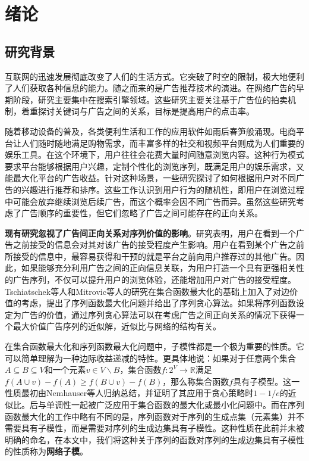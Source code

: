 \chapter{绪论}

\section{研究背景}
互联网的迅速发展彻底改变了人们的生活方式。它突破了时空的限制，极大地便利了人们获取各种信息的能力。随之而来的是广告推荐技术的演进。在网络广告的早期阶段，研究主要集中在搜索引擎领域。这些研究主要关注基于广告位的拍卖机制，着重探讨关键词与广告之间的关系，目标是提高用户的点击率\cite{edelman2007internet,attenberg2009modeling}。

随着移动设备的普及，各类便利生活和工作的应用软件如雨后春笋般涌现。电商平台让人们随时随地满足购物需求，而丰富多样的社交和视频平台则成为人们重要的娱乐工具。在这个环境下，用户往往会花费大量时间随意浏览内容。这种行为模式要求平台能够根据用户兴趣，定制个性化的浏览序列，既满足用户的娱乐需求，又能最大化平台的广告收益。针对这种场景，一些研究\cite{kempe2008cascade,craswell2008experimental,tang2017robust}探讨了如何根据用户对不同广告的兴趣进行推荐和排序。这些工作认识到用户行为的随机性，即用户在浏览过程中可能会放弃继续浏览后续广告，而这个概率会因不同广告而异。虽然这些研究考虑了广告顺序的重要性，但它们忽略了广告之间可能存在的正向关系。

\textbf{现有研究忽视了广告间正向关系对序列价值的影响}。研究表明，用户在看到一个广告之前接受的信息会对其对该广告的接受程度产生影响\cite{loda2005sequence}。用户在看到某个广告之前所接受的信息中，最容易获得和干预的就是平台之前向用户推荐过的其他广告。因此，如果能够充分利用广告之间的正向信息关联，为用户打造一个具有更强相关性的广告序列，不仅可以提升用户的浏览体验，还能增加用户对广告的接受程度。Tschiatschek等人\cite{tschiatschek2017selecting}和Mitrovic等人\cite{mitrovic2018submodularity}的研究在集合函数最大化的基础上加入了对边价值的考虑，提出了序列函数最大化问题并给出了序列贪心算法。如果将序列函数设定为广告的价值，通过序列贪心算法可以在考虑广告之间正向关系的情况下获得一个最大价值广告序列的近似解，近似比与网络的结构有关。

在集合函数最大化和序列函数最大化问题中，子模性都是一个极为重要的性质。它可以简单理解为一种边际收益递减的特性。更具体地说：如果对于任意两个集合$A\subseteq B \subseteq V$和一个元素$v\in V\backslash B$，集合函数$f: 2^V \to \mathbb{R}$满足$f(A\cup v) - f(A) \ge f(B\cup v) -f(B)$，那么称集合函数$f$具有子模型。这一性质最初由Nemhauser\cite{nemhauser1978analysis}等人归纳总结，并证明了其应用于贪心策略时$1-1/e$的近似比。后与单调性一起被广泛应用于集合函数的最大化或最小化问题中\cite{nemhauser1978best,khuller1999budgeted}。而在序列函数最大化的工作中\cite{tschiatschek2017selecting,mitrovic2018submodularity}略有不同的是，序列函数对于序列的生成点集（元素集）并不需要具有子模性，而是需要对序列的生成边集具有子模性。这种性质在此前并未被明确的命名，在本文中，我们将这种关于序列的函数对序列的生成边集具有子模性的性质称为\textbf{网络子模}。 

